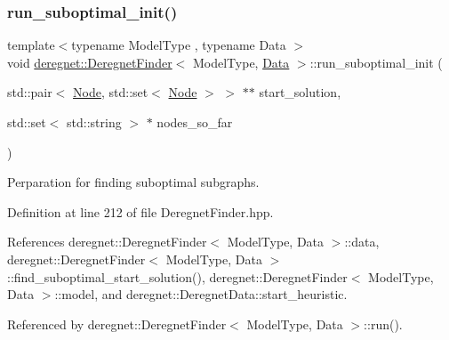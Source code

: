 \subsubsection{\texorpdfstring{run\+\_\+suboptimal\+\_\+init()}{run\_suboptimal\_init()}}
{\footnotesize\ttfamily template$<$typename Model\+Type , typename Data $>$ \\
void \hyperlink{classderegnet_1_1DeregnetFinder}{deregnet\+::\+Deregnet\+Finder}$<$ Model\+Type, \hyperlink{avgdrgnt_8cpp_a1d1235306db276e9b36acba1db1509e8}{Data} $>$\+::run\+\_\+suboptimal\+\_\+init (\begin{DoxyParamCaption}\item[{std\+::pair$<$ \hyperlink{namespacederegnet_a744bad34f2de9856d36715a445f027f3}{Node}, std\+::set$<$ \hyperlink{namespacederegnet_a744bad34f2de9856d36715a445f027f3}{Node} $>$ $>$ $\ast$$\ast$}]{start\+\_\+solution,  }\item[{std\+::set$<$ std\+::string $>$ $\ast$}]{nodes\+\_\+so\+\_\+far }\end{DoxyParamCaption})\hspace{0.3cm}{\ttfamily [private]}}



Perparation for finding suboptimal subgraphs. 



Definition at line 212 of file Deregnet\+Finder.\+hpp.



References deregnet\+::\+Deregnet\+Finder$<$ Model\+Type, Data $>$\+::data, deregnet\+::\+Deregnet\+Finder$<$ Model\+Type, Data $>$\+::find\+\_\+suboptimal\+\_\+start\+\_\+solution(), deregnet\+::\+Deregnet\+Finder$<$ Model\+Type, Data $>$\+::model, and deregnet\+::\+Deregnet\+Data\+::start\+\_\+heuristic.



Referenced by deregnet\+::\+Deregnet\+Finder$<$ Model\+Type, Data $>$\+::run().


